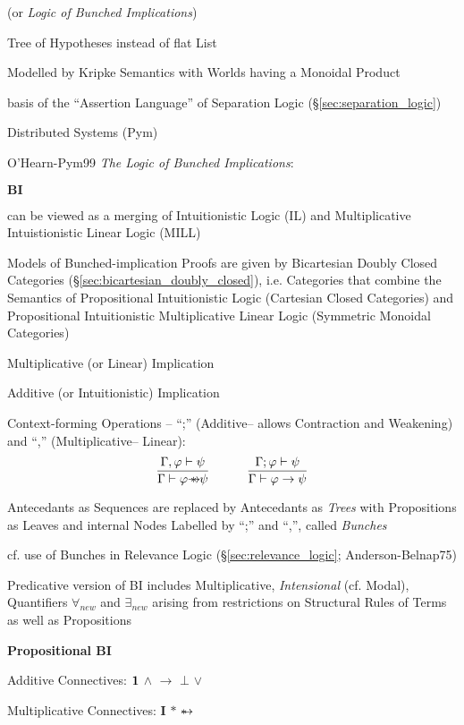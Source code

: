 \newcommand{\implmult}{\mathrlap{\rightarrow}*}
\renewcommand{\Id}{\mathbf{I}}

(or \emph{Logic of Bunched Implications})

Tree of Hypotheses instead of flat List

Modelled by Kripke Semantics with Worlds having a Monoidal Product

basis of the ``Assertion Language'' of Separation Logic
(\S\ref{sec:separation_logic})

Distributed Systems (Pym)

O'Hearn-Pym99 \emph{The Logic of Bunched Implications}:

$\textbf{BI}$

can be viewed as a merging of Intuitionistic Logic (IL) and
Multiplicative Intuistionistic Linear Logic (MILL)

Models of Bunched-implication Proofs are given by Bicartesian Doubly
Closed Categories (\S\ref{sec:bicartesian_doubly_closed}), i.e.
Categories that combine the Semantics of Propositional Intuitionistic
Logic (Cartesian Closed Categories) and Propositional Intuitionistic
Multiplicative Linear Logic (Symmetric Monoidal Categories)

Multiplicative (or Linear) Implication

Additive (or Intuitionistic) Implication

Context-forming Operations -- ``;'' (Additive-- allows Contraction and
Weakening) and ``,'' (Multiplicative-- Linear):
\[
  \frac{\Gamma,\varphi \vdash \psi}
    {\Gamma \vdash \varphi \implmult \psi}
  \quad\quad\quad
  \frac{\Gamma;\varphi \vdash \psi}
    {\Gamma \vdash \varphi \rightarrow \psi}
\]

Antecedants as Sequences are replaced by Antecedants as \emph{Trees}
with Propositions as Leaves and internal Nodes Labelled by ``;'' and
``,'', called \emph{Bunches}

cf. use of Bunches in Relevance Logic (\S\ref{sec:relevance_logic};
Anderson-Belnap75)

Predicative version of BI includes Multiplicative, \emph{Intensional}
(cf. Modal), Quantifiers $\forall_{new}$ and $\exists_{new}$ arising
from restrictions on Structural Rules of Terms as well as Propositions


\textbf{Propositional BI}

Additive Connectives: $\mathbf{1}$ $\wedge$ $\rightarrow$ $\bot$ $\vee$

Multiplicative Connectives: $\Id$ $*$ $\implmult$

